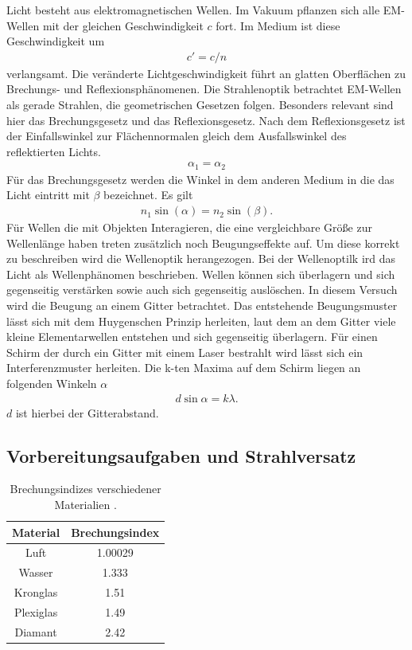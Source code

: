 Licht besteht aus elektromagnetischen Wellen.
Im Vakuum pflanzen sich alle EM-Wellen mit der gleichen Geschwindigkeit $c$ fort.
Im Medium ist diese Geschwindigkeit um 
\begin{align}
c'=c/n 
\label{eq:c_n}
\end{align}
verlangsamt.
Die veränderte Lichtgeschwindigkeit führt an glatten Oberflächen zu Brechungs- und Reflexionsphänomenen.
Die Strahlenoptik betrachtet EM-Wellen als gerade Strahlen, die geometrischen Gesetzen folgen.
Besonders relevant sind hier das Brechungsgesetz und das Reflexionsgesetz.
Nach dem Reflexionsgesetz ist der Einfallswinkel zur Flächennormalen gleich dem Ausfallswinkel des reflektierten Lichts.
\begin{align}
    \alpha_1 =\alpha_2
    \label{eq:reflexion}
\end{align}
Für das Brechungsgesetz werden die Winkel in dem anderen Medium in die das Licht eintritt mit $\beta$ bezeichnet.
Es gilt 
\begin{align}
    n_1 \sin(\alpha) = n_2 \sin(\beta).
    \label{eq:brechung}
\end{align}
Für Wellen die mit Objekten Interagieren, die eine vergleichbare Größe zur Wellenlänge haben 
treten zusätzlich noch Beugungseffekte auf.
Um diese korrekt zu beschreiben wird die Wellenoptik herangezogen.
Bei der Wellenoptilk ird das Licht als Wellenphänomen beschrieben.
Wellen können sich überlagern und sich gegenseitig verstärken sowie auch sich gegenseitig auslöschen.
In diesem Versuch wird die Beugung an einem Gitter betrachtet.
Das entstehende Beugungsmuster lässt sich mit dem Huygenschen Prinzip herleiten,
laut dem an dem Gitter viele kleine Elementarwellen entstehen und sich gegenseitig überlagern.
Für einen Schirm der durch ein Gitter mit einem Laser bestrahlt wird lässt sich ein Interferenzmuster herleiten.
Die k-ten Maxima auf dem Schirm liegen an folgenden Winkeln $\alpha$
\begin{align}
    d \sin{\alpha} = k \lambda.
    \label{eq:beugung}
\end{align}
$d$ ist hierbei der Gitterabstand.

\subsection{Vorbereitungsaufgaben und Strahlversatz}

\begin{table}
    \centering
    \begin{tabular}{c S }
        \toprule
        Material & {Brechungsindex}\\
        \midrule
        Luft        & 1.00029   \\
        Wasser      & 1.333     \\
        Kronglas    & 1.51      \\
        Plexiglas   & 1.49      \\
        Diamant     & 2.42      \\           
    \end{tabular}
    \caption{Brechungsindizes verschiedener Materialien \cite{brechungsindex}.}
    \label{tab:brechungsindex}
\end{table}

